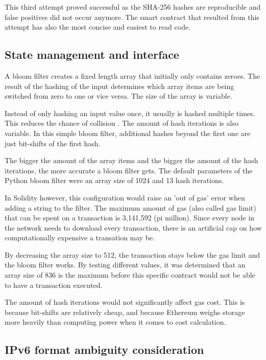 This third attempt proved successful as the SHA-256 hashes are reproducible and false positives did not occur anymore. The smart contract that resulted from this attempt has also the most concise and easiest to read code.

\subsection{State management and interface}

A bloom filter creates a fixed length array that initially only contains zeroes. The result of the hashing of the input determines which array items are being switched from zero to one or vice versa. The size of the array is variable.

Instead of only hashing an input value once, it usually is hashed multiple times. This reduces the chance of collision \cite{MultipleHashes}. The amount of hash iterations is also variable. In this simple bloom filter, additional hashes beyond the first one are just bit-shifts of the first hash.

The bigger the amount of the array items and the bigger the amount of the hash iterations, the more accurate a bloom filter gets. The default parameters of the Python bloom filter were an array size of 1024 and 13 hash iterations. \cite{SimpleBloomFilter} 

In Solidity however, this configuration would raise an 'out of gas' error when adding a string to the filter. 
The maximum amount of gas (also called gas limit) that can be spent on a transaction is 3,141,592 (pi million). Since every node in the network needs to download every transaction, there is an artificial cap on how computationally expensive a transation may be.

By decreasing the array size to 512, the transaction stays below the gas limit and the bloom filter works. 
By testing different values, it was determined that an array size of 836 is the maximum before this specific contract would not be able to have a transaction executed.

The amount of hash iterations would not significantly affect gas cost. This is because bit-shifts are relatively cheap, and because Ethereum weighs storage more heavily than computing power when it comes to cost calculation.

\subsection{IPv6 format ambiguity consideration}

